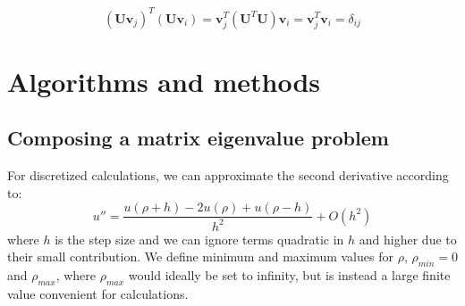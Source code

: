 \documentclass[10pt,showpacs,preprintnumbers,amsmath,amssymb,aps,prl,twocolumn,groupedaddress,superscriptaddress,showkeys]{revtex4-1}
\begin{document}
\begin{equation*}
\left(\mathbf{U} \mathbf{v}_j \right )^T \left(\mathbf{U} \mathbf{v}_i \right ) 
= \mathbf{v}_j^T\left (\mathbf{U}^T\mathbf{U} \right )\mathbf{v}_i = \mathbf{v}_j^T \mathbf{v}_i  = \delta_{ij}
\end{equation*}
\section{Algorithms and methods}
\subsection{Composing a matrix eigenvalue problem}
For discretized calculations, we can approximate the second derivative according to:
\begin{equation}
u''=\frac{u(\rho+h)-2u(\rho)+u(\rho-h)}{h^2}+O(h^2)
\end{equation}
where $h$ is the step size and we can ignore terms quadratic in $h$ and higher due to their small contribution. We define minimum and maximum values for $\rho$, $\rho_{min} = 0$ and $\rho_{max}$, where $\rho_{max}$ would ideally be set to infinity, but is instead a large finite value convenient for calculations.
\end{document}
